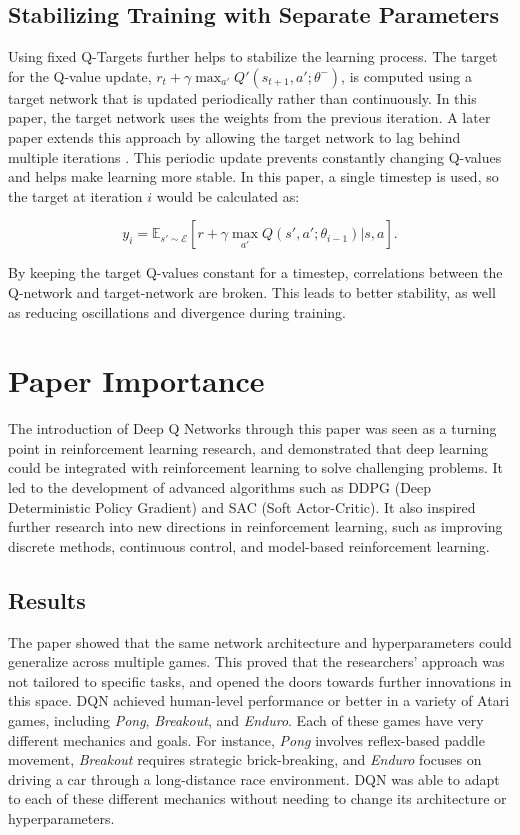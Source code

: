 \documentclass{article}
\begin{document}
\subsection{Stabilizing Training with Separate Parameters}
Using fixed Q-Targets further helps to stabilize the learning process. The target for the Q-value update, $r_{t}+\gamma \max_{a'}Q'(s_{t+1},a';\theta^{-})$, is computed using a target network that is updated periodically rather than continuously. In this paper, the target network uses the weights from the previous iteration. A later paper extends this approach by allowing the target network to lag behind multiple iterations \cite{targetNetwork}. This periodic update prevents constantly changing Q-values and helps make learning more stable. In this paper, a single timestep is used, so the target at iteration $i$ would be calculated as:

\[y_{i} = \mathbb{E}_{s'\sim \mathcal{E}} [r + \gamma \max_{a'}Q(s', a'; \theta_{i-1})|s, a].\]

By keeping the target Q-values constant for a timestep, correlations between the Q-network and target-network are broken. This leads to better stability, as well as reducing oscillations and divergence during training.

\section{Paper Importance}
The introduction of Deep Q Networks through this paper was seen as a turning point in reinforcement learning research, and demonstrated that deep learning could be integrated with reinforcement learning to solve challenging problems. It led to the development of advanced algorithms such as DDPG (Deep Deterministic Policy Gradient) and SAC (Soft Actor-Critic). It also inspired further research into new directions in reinforcement learning, such as improving discrete methods, continuous control, and model-based reinforcement learning. 

\subsection{Results}
The paper showed that the same network architecture and hyperparameters could generalize across multiple games. This proved that the researchers' approach was not tailored to specific tasks, and opened the doors towards further innovations in this space. DQN achieved human-level performance or better in a variety of Atari games, including \textit{Pong}, \textit{Breakout}, and \textit{Enduro}. Each of these games have very different mechanics and goals. For instance, \textit{Pong} involves reflex-based paddle movement, \textit{Breakout} requires strategic brick-breaking, and \textit{Enduro} focuses on driving a car through a long-distance race environment. DQN was able to adapt to each of these different mechanics without needing to change its architecture or hyperparameters.
\end{document}
